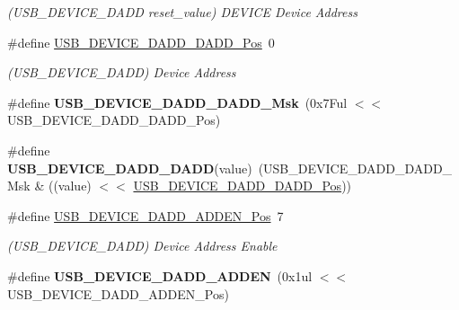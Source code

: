 \begin{DoxyCompactItemize}
\begin{DoxyCompactList}\small\item\em (U\+S\+B\+\_\+\+D\+E\+V\+I\+C\+E\+\_\+\+D\+A\+D\+D reset\+\_\+value) D\+E\+V\+I\+C\+E Device Address \end{DoxyCompactList}\item 
\hypertarget{group___s_a_m_l21___u_s_b_gac1a51843cc66433e2fdcbf772de3363f}{}\#define \hyperlink{group___s_a_m_l21___u_s_b_gac1a51843cc66433e2fdcbf772de3363f}{U\+S\+B\+\_\+\+D\+E\+V\+I\+C\+E\+\_\+\+D\+A\+D\+D\+\_\+\+D\+A\+D\+D\+\_\+\+Pos}~0\label{group___s_a_m_l21___u_s_b_gac1a51843cc66433e2fdcbf772de3363f}

\begin{DoxyCompactList}\small\item\em (U\+S\+B\+\_\+\+D\+E\+V\+I\+C\+E\+\_\+\+D\+A\+D\+D) Device Address \end{DoxyCompactList}\item 
\hypertarget{group___s_a_m_l21___u_s_b_ga8f1a4e144e51f34a87b2a8841d5be6bc}{}\#define {\bfseries U\+S\+B\+\_\+\+D\+E\+V\+I\+C\+E\+\_\+\+D\+A\+D\+D\+\_\+\+D\+A\+D\+D\+\_\+\+Msk}~(0x7\+Ful $<$$<$ U\+S\+B\+\_\+\+D\+E\+V\+I\+C\+E\+\_\+\+D\+A\+D\+D\+\_\+\+D\+A\+D\+D\+\_\+\+Pos)\label{group___s_a_m_l21___u_s_b_ga8f1a4e144e51f34a87b2a8841d5be6bc}

\item 
\hypertarget{group___s_a_m_l21___u_s_b_ga87709ef60ddc1080b34c47afcc42cf1b}{}\#define {\bfseries U\+S\+B\+\_\+\+D\+E\+V\+I\+C\+E\+\_\+\+D\+A\+D\+D\+\_\+\+D\+A\+D\+D}(value)~(U\+S\+B\+\_\+\+D\+E\+V\+I\+C\+E\+\_\+\+D\+A\+D\+D\+\_\+\+D\+A\+D\+D\+\_\+\+Msk \& ((value) $<$$<$ \hyperlink{group___s_a_m_l21___u_s_b_gac1a51843cc66433e2fdcbf772de3363f}{U\+S\+B\+\_\+\+D\+E\+V\+I\+C\+E\+\_\+\+D\+A\+D\+D\+\_\+\+D\+A\+D\+D\+\_\+\+Pos}))\label{group___s_a_m_l21___u_s_b_ga87709ef60ddc1080b34c47afcc42cf1b}

\item 
\hypertarget{group___s_a_m_l21___u_s_b_gab751763b1246001ab6b78edeed0ebaef}{}\#define \hyperlink{group___s_a_m_l21___u_s_b_gab751763b1246001ab6b78edeed0ebaef}{U\+S\+B\+\_\+\+D\+E\+V\+I\+C\+E\+\_\+\+D\+A\+D\+D\+\_\+\+A\+D\+D\+E\+N\+\_\+\+Pos}~7\label{group___s_a_m_l21___u_s_b_gab751763b1246001ab6b78edeed0ebaef}

\begin{DoxyCompactList}\small\item\em (U\+S\+B\+\_\+\+D\+E\+V\+I\+C\+E\+\_\+\+D\+A\+D\+D) Device Address Enable \end{DoxyCompactList}\item 
\hypertarget{group___s_a_m_l21___u_s_b_gab019330e647324f81caf99bcbc220a4f}{}\#define {\bfseries U\+S\+B\+\_\+\+D\+E\+V\+I\+C\+E\+\_\+\+D\+A\+D\+D\+\_\+\+A\+D\+D\+E\+N}~(0x1ul $<$$<$ U\+S\+B\+\_\+\+D\+E\+V\+I\+C\+E\+\_\+\+D\+A\+D\+D\+\_\+\+A\+D\+D\+E\+N\+\_\+\+Pos)\label{group___s_a_m_l21___u_s_b_gab019330e647324f81caf99bcbc220a4f}


\end{DoxyCompactItemize}
